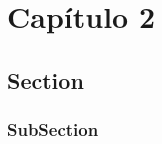 \chapter{Capítulo 2}\label{cap:2}

\lipsum
\section{Section}
\lipsum
\subsection{SubSection}
\lipsum
